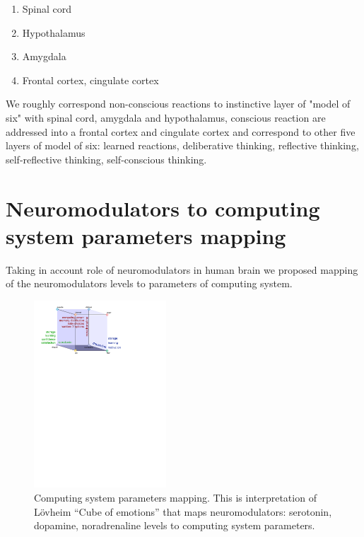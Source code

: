 \begin{enumerate}
 \item  Spinal cord
 \item  Hypothalamus
 \item  Amygdala
 \item  Frontal cortex, cingulate cortex
\end{enumerate}

We roughly correspond non-conscious reactions to instinctive layer of "model of six" \cite{emotionmachine} with spinal cord, amygdala and hypothalamus, conscious reaction are addressed into a frontal cortex and cingulate cortex and correspond to other five layers of model of six: learned reactions, deliberative thinking, reflective thinking, self-reflective thinking, self-conscious thinking.

\section{Neuromodulators to computing system parameters mapping}

Taking in account role of neuromodulators in human brain \cite{cubeofemotions, emotionsbraintorobot, neuromodulatory} we proposed mapping of the neuromodulators levels to parameters of computing system.

\begin{figure}
\begin{center}
 \includegraphics[height=7cm]{figure3_cube_of_parameters}
\end{center}
\caption{Computing system parameters mapping. This is interpretation of  L\"{o}vheim ``Cube of emotions'' \cite{cubeofemotions} that maps neuromodulators: serotonin, dopamine, noradrenaline levels to computing system parameters.}
\label{figure3_cube_of_parameters}
\end{figure}

